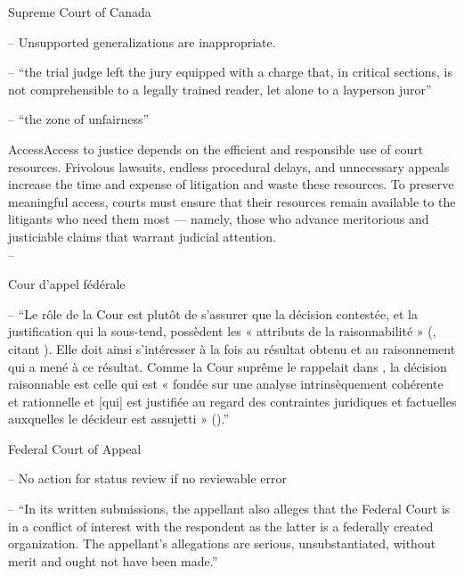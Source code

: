 


\p Supreme Court of Canada

-- Unsupported generalizations are inappropriate.

-- ``the trial judge left the jury equipped with a charge that, in critical sections, is not comprehensible to a legally trained reader, let alone to a layperson juror''

-- ``the zone of unfairness''

\begin{casequote}{Access}Access to justice depends on the efficient and responsible use of court resources. Frivolous lawsuits, endless procedural delays, and unnecessary appeals increase the time and expense of litigation and waste these resources. To preserve meaningful access, courts must ensure that their resources remain available to the litigants who need them most — namely, those who advance meritorious and justiciable claims that warrant judicial attention. \\[0.8\baselineskip]
-- 
\end{casequote}

\p 	Cour d'appel fédérale

-- \enquote{Le rôle de la Cour est plutôt de s’assurer que la décision contestée, et la justification qui la sous-tend, possèdent les « attributs de la raisonnabilité » (, citant ). Elle doit ainsi s’intéresser à la fois au résultat obtenu et au raisonnement qui a mené à ce résultat. Comme la Cour suprême le rappelait dans , la décision raisonnable est celle qui est « fondée sur une analyse intrinsèquement cohérente et rationnelle et [qui] est justifiée au regard des contraintes juridiques et factuelles auxquelles le décideur est assujetti » ().} 



\bigskip
{}

\p Federal Court of Appeal

-- No action for status review if no reviewable error

-- \enquote{In its written submissions, the appellant also alleges that the Federal Court is in a conflict of interest with the respondent as the latter is a federally created organization. The appellant’s allegations are serious, unsubstantiated, without merit and ought not have been made.}

